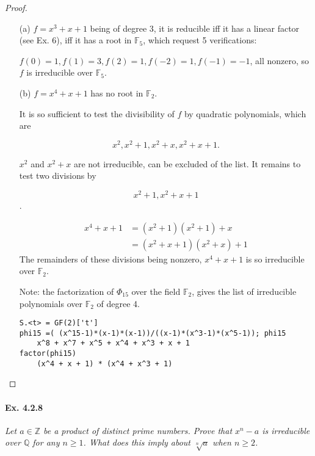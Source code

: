 \documentclass[11pt,a4paper]{article}
\newcommand{\Q}{\mathbb{Q}}
\newcommand{\Z}{\mathbb{Z}}
\newcommand{\F}{\mathbb{F}}
\begin{document}
\begin{proof}

\begin{enumerate}
\item[(a)]
$f= x^3+x+1$ being of degree 3, it is reducible iff it has a linear factor (see Ex. 6), iff  it has a root in $\mathbb{F}_5$, which request 5 verifications:

$f(0)=1, f(1)=3, f(2)=1, f(-2) = 1, f(-1) = -1$, all nonzero, so $f$ is irreducible over $\F_5$.

\item[(b)]
$f = x^4+x+1$ has no root in  $\F_2$.

It is so sufficient to test the divisibility of $f$ by quadratic polynomials, which are

$$x^2,x^2+1, x^2+x, x^2+x+1.$$

$x^2$ and $x^2+x$ are not irreducible, can be excluded of the list. It remains to test two divisions by

$$x^2+1,x^2+x+1$$.

\begin{align*}
x^4+x+1 &= (x^2+1)(x^2+1)+x\\
&=(x^2+x+1)(x^2+x)+1
\end{align*}
The remainders of these divisions being nonzero, $x^4+x+1$ is so irreducible over $\mathbb{F}_2$.

Note: the factorization of $\Phi_{15}$ over the field $\mathbb{F}_2$, gives the list of irreducible polynomials over $\mathbb{F}_2$ of degree 4.
\begin{verbatim}
S.<t> = GF(2)['t']
phi15 =( (x^15-1)*(x-1)*(x-1))/((x-1)*(x^3-1)*(x^5-1)); phi15
	x^8 + x^7 + x^5 + x^4 + x^3 + x + 1
factor(phi15)
	(x^4 + x + 1) * (x^4 + x^3 + 1)
\end{verbatim}
\end{enumerate}
\end{proof}

\paragraph{Ex. 4.2.8}

{\it Let $a\in \Z$ be a product of distinct prime numbers. Prove that $x^n-a$ is irreducible over $\Q$ for any $n\geq 1$. What does this imply about $\sqrt[n]{a}$ when $n\geq 2$.
}
\end{document}
